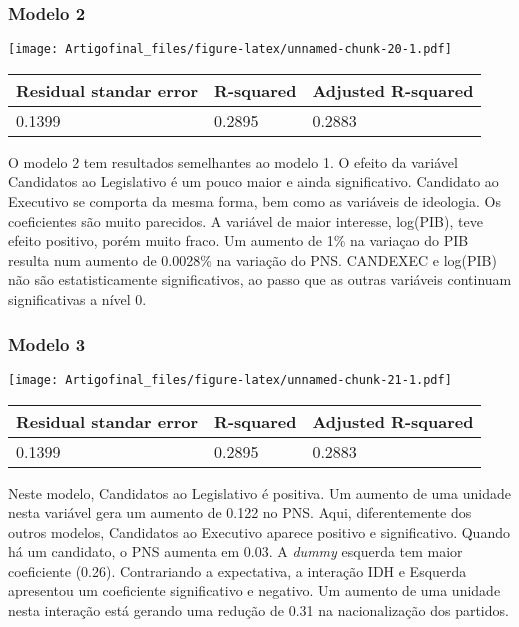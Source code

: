 \documentclass[]{article}
\begin{document}
\subsubsection{Modelo 2}\label{modelo-2}

\texttt{[image: Artigofinal\_files/figure-latex/unnamed-chunk-20-1.pdf]}

\begin{longtable}[]{@{}lll@{}}
\toprule
\textbf{Residual standar error} & \textbf{R-squared} & \textbf{Adjusted
R-squared}\tabularnewline
\midrule
\endhead
0.1399 & 0.2895 & 0.2883\tabularnewline
\bottomrule
\end{longtable}

O modelo 2 tem resultados semelhantes ao modelo 1. O efeito da variável
Candidatos ao Legislativo é um pouco maior e ainda significativo.
Candidato ao Executivo se comporta da mesma forma, bem como as variáveis
de ideologia. Os coeficientes são muito parecidos. A variável de maior
interesse, log(PIB), teve efeito positivo, porém muito fraco. Um aumento
de 1\% na variaçao do PIB resulta num aumento de 0.0028\% na variação do
PNS. CANDEXEC e log(PIB) não são estatisticamente significativos, ao
passo que as outras variáveis continuam significativas a nível 0.

\newpage

\subsubsection{Modelo 3}\label{modelo-3}

\texttt{[image: Artigofinal\_files/figure-latex/unnamed-chunk-21-1.pdf]}

\begin{longtable}[]{@{}lll@{}}
\toprule
\textbf{Residual standar error} & \textbf{R-squared} & \textbf{Adjusted
R-squared}\tabularnewline
\midrule
\endhead
0.1399 & 0.2895 & 0.2883\tabularnewline
\bottomrule
\end{longtable}

Neste modelo, Candidatos ao Legislativo é positiva. Um aumento de uma
unidade nesta variável gera um aumento de 0.122 no PNS. Aqui,
diferentemente dos outros modelos, Candidatos ao Executivo aparece
positivo e significativo. Quando há um candidato, o PNS aumenta em 0.03.
A \emph{dummy} esquerda tem maior coeficiente (0.26). Contrariando a
expectativa, a interação IDH e Esquerda apresentou um coeficiente
significativo e negativo. Um aumento de uma unidade nesta interação está
gerando uma redução de 0.31 na nacionalização dos partidos.
\end{document}
